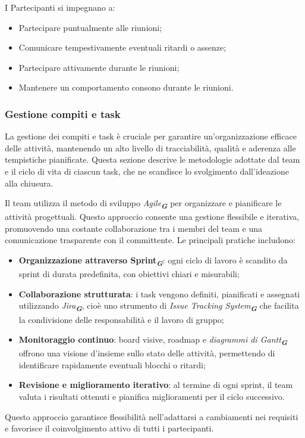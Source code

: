 I Partecipanti si impegnano a:
\begin{itemize}
    \item Partecipare puntualmente alle riunioni;
    \item Comunicare tempestivamente eventuali ritardi o assenze;
    \item Partecipare attivamente durante le riunioni;
    \item Mantenere un comportamento consono durante le riunioni.
\end{itemize}

\subsubsection{Gestione compiti e task}
La gestione dei compiti e task è cruciale per garantire un’organizzazione efficace delle attività, mantenendo un alto livello di tracciabilità, qualità e aderenza alle tempistiche pianificate. 
Questa sezione descrive le metodologie adottate dal team e il ciclo di vita di ciascun task, che ne scandisce lo svolgimento dall’ideazione alla chiusura.

Il team utilizza il metodo di sviluppo \emph{Agile}\textsubscript{\textit{\textbf{G}}} per organizzare e pianificare le attività progettuali. 
Questo approccio consente una gestione flessibile e iterativa, promuovendo una costante collaborazione tra i membri del team e una comunicazione trasparente con il committente. 
Le principali pratiche includono:
\begin{itemize}
    \item \textbf{Organizzazione attraverso Sprint\textsubscript{\textit{\textbf{G}}}}: ogni ciclo di lavoro è scandito da sprint di durata predefinita, con obiettivi chiari e misurabili;
    \item \textbf{Collaborazione strutturata}: i task vengono definiti, pianificati e assegnati utilizzando \emph{Jira}\textsubscript{\textit{\textbf{G}}}, cioè uno strumento di \emph{Issue Tracking System}\textsubscript{\textit{\textbf{G}}} che facilita la condivisione delle responsabilità e il lavoro di gruppo;
    \item \textbf{Monitoraggio continuo}: board visive, roadmap e \emph{diagrammi di Gantt}\textsubscript{\textit{\textbf{G}}} offrono una visione d'insieme sullo stato delle attività, permettendo di identificare rapidamente eventuali blocchi o ritardi;
    \item \textbf{Revisione e miglioramento iterativo}: al termine di ogni sprint, il team valuta i risultati ottenuti e pianifica miglioramenti per il ciclo successivo.
\end{itemize}
Questo approccio garantisce flessibilità nell'adattarsi a cambiamenti nei requisiti e favorisce il coinvolgimento attivo di tutti i partecipanti.

